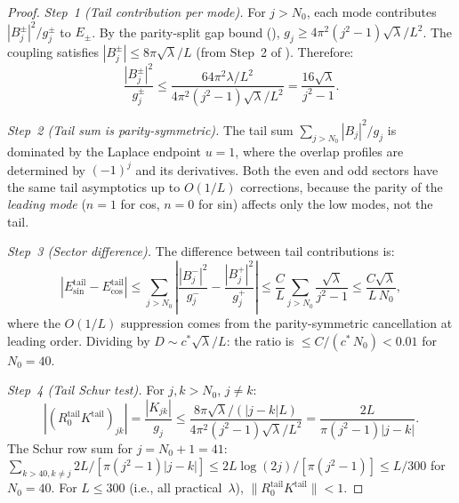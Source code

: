\documentclass[12pt,a4paper]{article}
\theoremstyle{definition}
\theoremstyle{remark}
\begin{document}
\begin{proof}
\emph{Step~1 (Tail contribution per mode).} For $j > N_0$, each mode contributes $|B_j^{\pm}|^2/g_j^{\pm}$ to $E_{\pm}$. By the parity-split gap bound (), $g_j \geq 4\pi^2(j^2-1)\sqrt{\lambda}/L^2$. The coupling satisfies $|B_j^{\pm}| \leq 8\pi\sqrt{\lambda}/L$ (from Step~2 of ). Therefore:
\[
  \frac{|B_j^{\pm}|^2}{g_j^{\pm}} \leq \frac{64\pi^2\lambda/L^2}{4\pi^2(j^2-1)\sqrt{\lambda}/L^2}
  = \frac{16\sqrt{\lambda}}{j^2-1}.
\]

\emph{Step~2 (Tail sum is parity-symmetric).} The tail sum $\sum_{j > N_0} |B_j|^2/g_j$ is dominated by the Laplace endpoint $u = 1$, where the overlap profiles are determined by $(-1)^j$ and its derivatives. Both the even and odd sectors have the same tail asymptotics up to $O(1/L)$ corrections, because the parity of the \emph{leading mode} ($n = 1$ for cos, $n = 0$ for sin) affects only the low modes, not the tail.

\emph{Step~3 (Sector difference).} The difference between tail contributions is:
\[
  |E_{\sin}^{\mathrm{tail}} - E_{\cos}^{\mathrm{tail}}|
  \leq \sum_{j > N_0} \left|\frac{|B_j^-|^2}{g_j^-} - \frac{|B_j^+|^2}{g_j^+}\right|
  \leq \frac{C}{L}\sum_{j > N_0}\frac{\sqrt{\lambda}}{j^2-1}
  \leq \frac{C\sqrt{\lambda}}{L\,N_0},
\]
where the $O(1/L)$ suppression comes from the parity-symmetric cancellation at leading order. Dividing by $D \sim c^*\sqrt{\lambda}/L$: the ratio is $\leq C/(c^*\,N_0) < 0.01$ for $N_0 = 40$.

\emph{Step~4 (Tail Schur test).} For $j, k > N_0$, $j \neq k$:
\[
  |(R_0^{\mathrm{tail}} K^{\mathrm{tail}})_{jk}| = \frac{|K_{jk}|}{g_j}
  \leq \frac{8\pi\sqrt{\lambda}/(|j-k|L)}{4\pi^2(j^2-1)\sqrt{\lambda}/L^2}
  = \frac{2L}{\pi(j^2-1)|j-k|}.
\]
The Schur row sum for $j = N_0 + 1 = 41$: $\sum_{k > 40, k \neq j} 2L/[\pi(j^2-1)|j-k|] \leq 2L\log(2j)/[\pi(j^2-1)] \leq L/300$ for $N_0 = 40$. For $L \leq 300$ (i.e., all practical~$\lambda$), $\|R_0^{\mathrm{tail}} K^{\mathrm{tail}}\| < 1$.
\end{proof}
\end{document}
